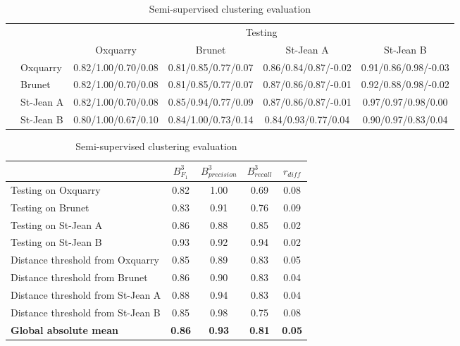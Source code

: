 \begin{table}
  \centering
  \caption{Semi-supervised clustering evaluation}
  \label{tab:semi_supervised_clustering}

  \label{tab:semi_supervised_clustering_train_test}
  \begin{tabular}{l l| c c c c}
    \toprule
    \multicolumn{2}{c}{\multirow{2}{*}{}} & \multicolumn{4}{c}{Testing} \\
    \multicolumn{2}{c}{} & Oxquarry & Brunet & St-Jean A & St-Jean B \\
    \midrule
    \parbox[t]{2mm}{}
    & Oxquarry
    & 0.82/1.00/0.70/0.08
    & 0.81/0.85/0.77/0.07
    & 0.86/0.84/0.87/-0.02
    & 0.91/0.86/0.98/-0.03
    \\
    & Brunet
    & 0.82/1.00/0.70/0.08
    & 0.81/0.85/0.77/0.07
    & 0.87/0.86/0.87/-0.01
    & 0.92/0.88/0.98/-0.02
    \\
    & St-Jean A
    & 0.82/1.00/0.70/0.08
    & 0.85/0.94/0.77/0.09
    & 0.87/0.86/0.87/-0.01
    & 0.97/0.97/0.98/0.00
    \\
    & St-Jean B
    & 0.80/1.00/0.67/0.10
    & 0.84/1.00/0.73/0.14
    & 0.84/0.93/0.77/0.04
    & 0.90/0.97/0.83/0.04
    \\
    \bottomrule
  \end{tabular}

  \vspace{0.5cm}

  \label{tab:semi_supervised_clustering_average}
  \begin{tabular}{l c c c c}
    \toprule
    & $B^{3}_{F_1}$
    & $B^{3}_{precision}$
    & $B^{3}_{recall}$
    & $r_{diff}$ \\
    \midrule
    Testing on Oxquarry               & 0.82 & 1.00 & 0.69 & 0.08 \\
    Testing on Brunet                 & 0.83 & 0.91 & 0.76 & 0.09 \\
    Testing on St-Jean A              & 0.86 & 0.88 & 0.85 & 0.02 \\
    Testing on St-Jean B              & 0.93 & 0.92 & 0.94 & 0.02 \\
    Distance threshold from Oxquarry  & 0.85 & 0.89 & 0.83 & 0.05 \\
    Distance threshold from Brunet    & 0.86 & 0.90 & 0.83 & 0.04 \\
    Distance threshold from St-Jean A & 0.88 & 0.94 & 0.83 & 0.04 \\
    Distance threshold from St-Jean B & 0.85 & 0.98 & 0.75 & 0.08 \\
    \textbf{Global absolute mean} & \textbf{0.86} & \textbf{0.93} & \textbf{0.81} & \textbf{0.05} \\
    \bottomrule
  \end{tabular}
\end{table}
